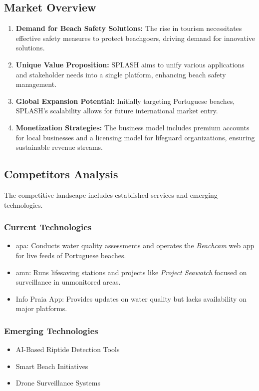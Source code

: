 \subsection{Market Overview}
\begin{enumerate}
    \item \textbf{Demand for Beach Safety Solutions:} The rise in tourism necessitates effective safety measures to protect beachgoers, driving demand for innovative solutions.
    \item \textbf{Unique Value Proposition:} SPLASH aims to unify various applications and stakeholder needs into a single platform, enhancing beach safety management.
    \item \textbf{Global Expansion Potential:} Initially targeting Portuguese beaches, SPLASH's scalability allows for future international market entry.
    \item \textbf{Monetization Strategies:} The business model includes premium accounts for local businesses and a licensing model for lifeguard organizations, ensuring sustainable revenue streams.
\end{enumerate}

\subsection{Competitors Analysis}
The competitive landscape includes established services and emerging technologies.

\subsubsection{Current Technologies}
\begin{itemize}
    \item \ac{apa}: Conducts water quality assessments and operates the \textit{Beachcam} web app for live feeds of Portuguese beaches.
    \item \ac{amn}: Runs lifesaving stations and projects like \textit{Project Seawatch} focused on surveillance in unmonitored areas.
    \item Info Praia App: Provides updates on water quality but lacks availability on major platforms.
\end{itemize}

\subsubsection{Emerging Technologies}
\begin{itemize}
    \item AI-Based Riptide Detection Tools
    \item Smart Beach Initiatives
    \item Drone Surveillance Systems
\end{itemize}

